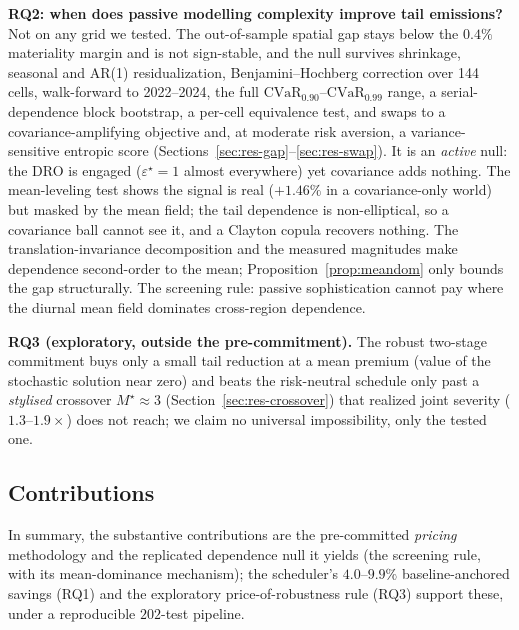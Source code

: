 \documentclass[12pt]{article}
\newcommand{\CVaR}{\mathrm{CVaR}}
\begin{document}
\textbf{RQ2: when does passive modelling complexity improve tail emissions?} Not on any
grid we tested. The out-of-sample spatial gap stays below the $0.4\%$ materiality margin
and is not sign-stable, and the null survives shrinkage, seasonal and AR(1)
residualization, Benjamini--Hochberg correction over 144 cells, walk-forward to
2022--2024, the full $\CVaR_{0.90}$--$\CVaR_{0.99}$ range, a serial-dependence block
bootstrap, a per-cell equivalence test, and swaps to a covariance-amplifying objective and,
at moderate risk aversion, a variance-sensitive entropic score
(Sections~\ref{sec:res-gap}--\ref{sec:res-swap}). It is an \emph{active} null: the DRO is
engaged ($\varepsilon^\star=1$ almost everywhere) yet covariance adds nothing. The
mean-leveling test shows the signal is real ($+1.46\%$ in a covariance-only world) but
masked by the mean field; the tail dependence is non-elliptical, so a covariance ball
cannot see it, and a Clayton copula recovers nothing.
The translation-invariance decomposition and the measured magnitudes make
dependence second-order to the mean; Proposition~\ref{prop:meandom} only bounds the gap structurally. The screening rule: passive sophistication cannot pay
where the diurnal mean field dominates cross-region dependence.

\textbf{RQ3 (exploratory, outside the pre-commitment).} The robust two-stage commitment buys
only a small tail reduction at a mean premium (value of the stochastic solution near zero) and
beats the risk-neutral schedule only past a \emph{stylised} crossover $M^\star\approx3$
(Section~\ref{sec:res-crossover}) that realized joint severity ($1.3$--$1.9\times$) does not
reach; we claim no universal impossibility, only the tested one.

\subsection{Contributions}
In summary, the substantive contributions are the pre-committed \emph{pricing} methodology
and the replicated dependence null it yields (the screening rule, with its mean-dominance
mechanism); the scheduler's $4.0$--$9.9\%$ baseline-anchored savings (RQ1) and the exploratory
price-of-robustness rule (RQ3) support these, under a reproducible $202$-test pipeline.
\end{document}
